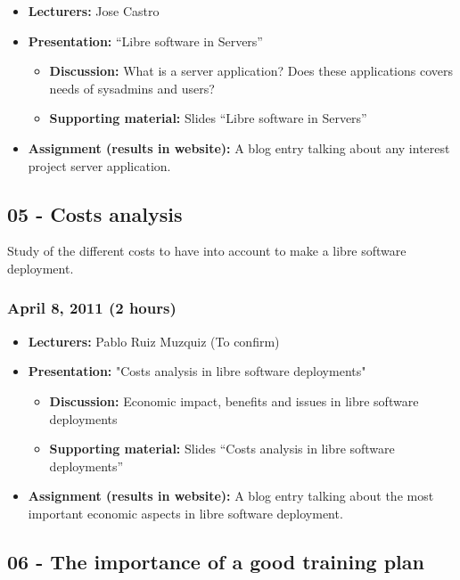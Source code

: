 \documentclass[a4paper]{article}
\begin{document}
\begin{itemize}
\item \textbf{Lecturers:} Jose Castro
\item \textbf{Presentation:} ``Libre software in Servers''
  \begin{itemize}
  \item \textbf{Discussion:} What is a server application? Does these applications covers needs of sysadmins and users?
  \item \textbf{Supporting material:} Slides ``Libre software in Servers''
  \end{itemize}
\item \textbf{Assignment (results in website):} A blog entry talking about any interest project server application.
\end{itemize}



\subsection{05 - Costs analysis }

Study of the different costs to have into account to make a libre software deployment. 

\subsubsection{April 8, 2011 (2 hours)}

\begin{itemize}
\item \textbf{Lecturers:} Pablo Ruiz Muzquiz (To confirm)
\item \textbf{Presentation:} "Costs analysis in libre software deployments"
  \begin{itemize}
  \item \textbf{Discussion:} Economic impact, benefits and issues in libre software deployments
  \item \textbf{Supporting material:} Slides ``Costs analysis in libre software deployments''
  \end{itemize}
\item \textbf{Assignment (results in website):} A blog entry talking about the most important economic aspects in libre software deployment.
\end{itemize}


\subsection{06 - The importance of a good training plan }
\end{document}
